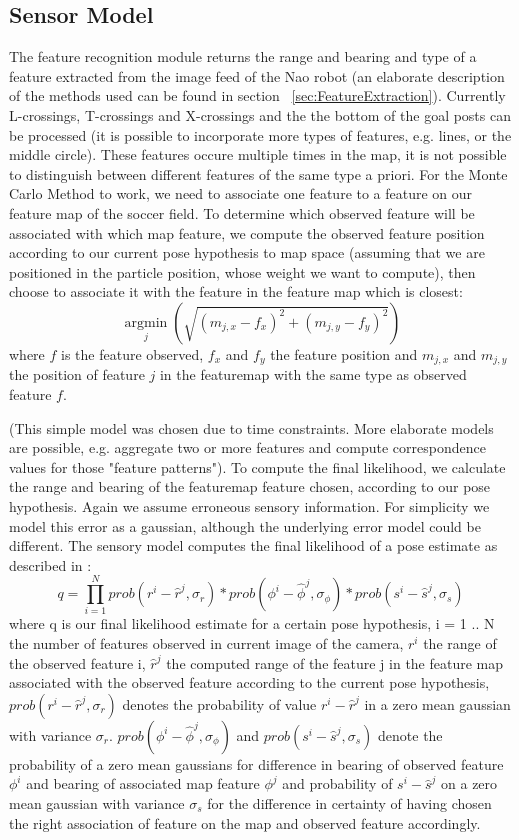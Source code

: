 \documentclass[	DIV=calc,%
							paper=a4,%
							fontsize=9pt,%
							twocolumn]{scrartcl}	 					%
\begin{document}
\subsection{Sensor Model}
\label{sec:SensorModel}
The feature recognition module returns the range and bearing and type of a feature extracted from the image feed of the Nao robot (an elaborate description of the methods used can be found in section ~\ref{sec:FeatureExtraction}). Currently L-crossings, T-crossings and X-crossings and the the bottom of the goal posts can be processed (it is possible to incorporate more types of features, e.g. lines, or the middle circle). These features occure multiple times in the map, it is not possible to distinguish between different features of the same type a priori. For the Monte Carlo Method to work, we need to associate one feature to a feature on our feature map of the soccer field. To determine which observed feature will be associated with which map feature, we compute the observed feature position according to our current pose hypothesis to map space (assuming that we are positioned in the particle position, whose weight we want to compute), then choose to associate it with the feature in the feature map which is closest:
\[\underset{j}{\operatorname{argmin}}  (\sqrt{(m_{j,x} - f_x)^2 + (m_{j,y} - f_y)^2})   \] 
where $f$ is the feature observed, $f_x$ and $f_y$ the feature position and $m_{j,x}$ and $m_{j,y}$ the position of feature $j$ in the featuremap with the same type as observed feature $f$. 

(This simple model was chosen due to time constraints. More elaborate models are possible, e.g. aggregate two or more features and compute correspondence values for those "feature patterns"). To compute the final likelihood, we calculate the range and bearing of the featuremap feature chosen, according to our pose hypothesis. Again we assume erroneous sensory information. For simplicity we model this error as a gaussian, although the underlying error model could be different. 
The sensory model computes the final likelihood of a pose estimate as described in \cite{ProbabilisticRobotics}:
\[ q = \prod\limits_{i=1}^{N}{ prob(r^i  - \hat{r}^j,\sigma_r) * prob(\phi^i - \hat{\phi}^j ,\sigma_{\phi}) * prob(s^i - \hat{s}^j ,\sigma_s)  }  \]
where q is our final likelihood estimate for a certain pose hypothesis, i = 1 .. N the number of features observed in current image of the camera, $ r^i $ the range of the observed feature i, $\hat{r}^j$ the computed range of the feature j in the feature map associated with the observed feature according to the current pose hypothesis, $prob(r^i - \hat{r}^j,\sigma_r)$ denotes the probability of value $r^i - \hat{r}^j$ in a zero mean gaussian with variance $\sigma_r$. $prob(\phi^i - \hat{\phi}^j ,\sigma_{\phi})$ and  $prob(s^i - \hat{s}^j ,\sigma_s)$ denote the probability of a zero mean gaussians for difference in bearing of observed feature $\phi^i$ and bearing of associated map feature $\phi^j$ and probability of $s^i - \hat{s}^j$ on a zero mean gaussian with variance $\sigma_s$ for the difference in certainty of having chosen the right association of feature on the map and observed feature accordingly.
\end{document}
